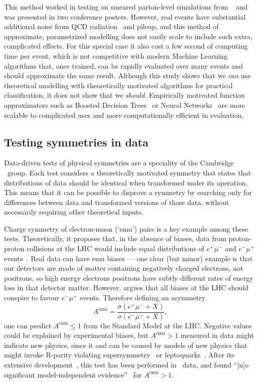 This method worked in testing on smeared parton-level simulations from
\madgraph~\cite{Alwall:2014hca} and was presented in two conference posters.
However, real events have substantial additional noise from QCD
radiation~\cite{PhysRevD.83.074010} and pileup, and this method of approximate,
parametrized modelling does not easily scale to include such extra, complicated
effects.
For this special case it also cost a few second of computing time per event,
which is not competitive with modern Machine Learning algorithms that, once
trained, can be rapidly evaluated over many events and should approximate
the same result.
Although this study shows that we \emph{can} use theoretical modelling
with theoretically motivated algorithms for practical classification, it does
not show that we \emph{should}.
Empirically motivated function approximators such as
Boosted Decision Trees~\cite{xgboost} or
Neural Networks~\cite{MurphyKevinP.2012Mlap} are more scalable to complicated
uses and more computationally efficient in evaluation.

\subsection{Testing symmetries in data}
Data-driven tests of physical symmetries are a speciality of the Cambridge
\atlas\ group.
Each test considers a theoretically motivated symmetry that states that
distributions of data should be identical when transformed under its operation.
This means that it can be possible to disprove a symmetry by searching only
for differences between data and transformed versions of those data, without
necessarily requiring other theoretical inputs.

Charge symmetry of electron-muon (`emu') pairs is a key example among these
tests.
Theoretically, it proposes that, in the absence of biases, data
from proton-proton collisions at the LHC would include equal distributions
of $e^+\mu^-$ and $e^-\mu^+$ events~\cite{Lester:2016qdv}.
Real data can have emu biases --- one clear (but minor) example is that our
detectors are made of matter containing negatively charged electrons, not
positrons, so high energy electrons positrons have subtly different rates of
energy loss in that detector matter.
However, \cite{Lester:2016qdv} argues that all biases at the LHC should
conspire to favour $e^-\mu^+$ events.
Therefore defining an asymmetry
\begin{equation}
A^\mathrm{emu} = \frac{
\sigma(e^+\mu^- + X)
}{
\sigma(e^-\mu^+ + X)
}
,
\end{equation}
one can predict $A^\mathrm{emu} \leq 1$ from the Standard Model at the LHC.
Negative values could be explained by experimental biases, but
$A^\mathrm{emu} > 1$ measured in data might indicate new physics, since it and
can be caused by models of new physics that might invoke R-parity violating
supersymmetry~\cite{Lester:2016qdv} or leptoquarks~\cite{EXOT-2018-29}.
After its extensive development~\cite{Brunt:2674708,Pacey:2747774},
this test has been performed in \atlas\ data, and found ``[n]o significant
model-independent evidence''~\cite{EXOT-2018-29} for $A^\mathrm{emu} > 1$.

